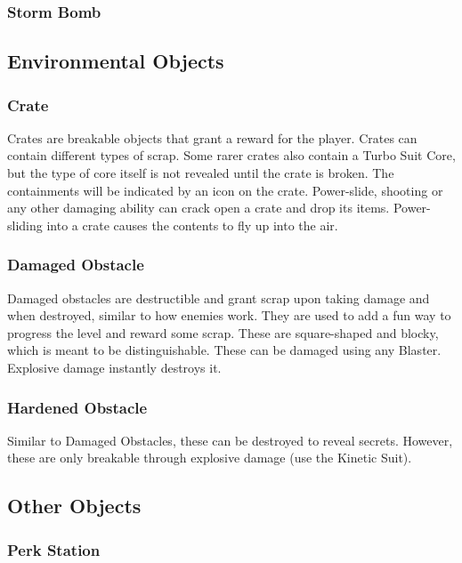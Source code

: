 \documentclass[12pt]{article}
\begin{document}
\subsubsection{Storm Bomb}

\subsection{Environmental Objects}

\subsubsection{Crate}

Crates are breakable objects that grant a reward for the player. Crates can contain different types of scrap. Some rarer crates also contain a Turbo Suit Core, but the type of core itself is not revealed until the crate is broken. The containments will be indicated by an icon on the crate. Power-slide, shooting or any other damaging ability can crack open a crate and drop its items. Power-sliding into a crate causes the contents to fly up into the air. 

\subsubsection{Damaged Obstacle}

Damaged obstacles are destructible and grant scrap upon taking damage and when destroyed, similar to how enemies work. They are used to add a fun way to progress the level and reward some scrap. These are square-shaped and blocky, which is meant to be distinguishable. These can be damaged using any Blaster. Explosive damage instantly destroys it. 

\subsubsection{Hardened Obstacle}

Similar to Damaged Obstacles, these can be destroyed to reveal secrets. However, these are only breakable through explosive damage (use the Kinetic Suit). 

\subsection{Other Objects}

\subsubsection{Perk Station}
\end{document}
